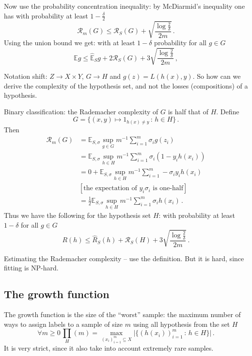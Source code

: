 \documentclass[a4paper]{article}
\newcommand{\ex}{\mathbb{E}}
\begin{document}
Now use the probability concentration inequality: by McDiarmid's inequality one
has with probability at least $1-\frac{\delta}{2}$
\[\mathcal{R}_m(G) \leq \mathcal{R}_S(G) + \sqrt{\frac{\log\frac{2}{\delta}}{2m}} \,. \]
Using the union bound we get: with at least $1-\delta$ probability for all $g\in G$
\[ \ex g \leq \hat{\ex}_S g + 2 \mathcal{R}_S(G) + 3 \sqrt{\frac{\log\frac{2}{\delta}}{2m}} \,, \]

Notation shift: $Z \to X\times Y$, $G \to H$ and $g(z) = L(h(x), y)$. So how can we
derive the complexity of the hypothesis set, and not the losses (compositions) of a
hypothesis.

Binary classification: the Rademacher complexity of $G$ is half that of $H$. Define
\[ G = \{(x,y)\mapsto 1_{h(x)\neq y}\,:\, h\in H\} \,. \]
Then
\begin{align}
	\mathcal{R}_m(G)
		&= \ex_{S, \sigma} \sup_{g\in G} m^{-1} \sum_{i=1}^m \sigma_i g(z_i) \\
		&= \ex_{S, \sigma} \sup_{h\in H} m^{-1} \sum_{i=1}^m \sigma_i (1 - y_i h(x_i)) \\
		&= 0 + \ex_{S, \sigma} \sup_{h\in H} m^{-1} \sum_{i=1}^m - \sigma_i y_i h(x_i) \\
		&[\text{the expectation of } y_i \sigma_i \text{ is one-half}]\\
		&= \frac{1}{2} \ex_{S, \sigma} \sup_{h\in H} m^{-1} \sum_{i=1}^m \sigma_i h(x_i) \,.
\end{align}
Thus we have the following for the hypothesis set $H$: with probability at least $1-\delta$
for all $g\in G$
\[ R(h) \leq \hat{R}_S(h) + \mathcal{R}_S(H) + 3\sqrt{\frac{\log\frac{2}{\delta}}{2m}} \,.\]

Estimating the Rademacher complexity -- use the definition. But it is hard, since
fitting is NP-hard.


\subsection{The growth function} %
\label{sub:the_growth_function}


The growth function is the size of the ``worst'' sample: the maximum number of ways to
assign labels to a sample of size $m$ using all hypothesis from the set $H$
\[\forall m \geq 0\, \prod_H(m)
	= \max_{(x_i)_{i=1}^m \subseteq X}\bigl| \{ (h(x_i))_{i=1}^m\,:\,h\in H \} \bigr| \,. \]
It is very strict, since it also take into account extremely rare samples.
\end{document}
